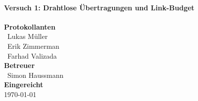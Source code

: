 \documentclass[a4paper, 11pt, oneside]{Thesis}  %
\begin{document}
\begin{titlepage}
\HRule \\[0.4cm]
{ \huge \bfseries Versuch 1: Drahtlose Übertragungen und Link-Budget}\\[0.4cm] %
\HRule \\[1.5cm]
 
\textbf{Protokollanten}\\
{\large\ Lukas Müller}\\[0.5cm]
{\large\ Erik Zimmerman}\\[0.2cm]
{\large\ Farhad Valizada}\\[0.2cm]

\textbf{Betreuer}\\
{\large\ Simon Haussmann}\\[0.2cm]



\textbf{Eingereicht}\\
{\large \today} %

 

\vfill %

\end{titlepage}


\clearpage  %





%
%
\end{document}
